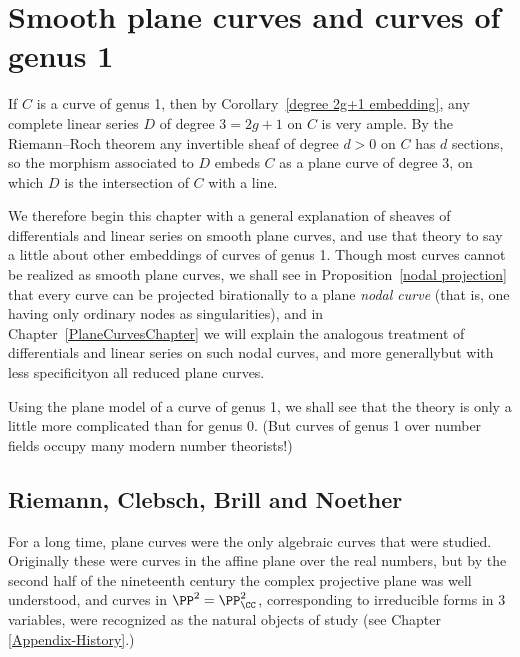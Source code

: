 
\chapter{Smooth plane curves and curves of genus 1}\label{3b}\label{genus 1 chapter}

If $C$ is a
%
curve of genus 1, then by Corollary~\ref{degree 2g+1 embedding}, any complete linear series $D$ of
degree $3 = 2g+1$ on $C$ is very ample. By the Riemann--Roch theorem any invertible sheaf
of degree $d>0$ on $C$ has $d$ sections, so the morphism associated to $D$ embeds $C$
as a plane curve of degree 3, on which $D$ is the intersection of $C$ with a line.

We therefore begin this chapter with a general explanation of
%
sheaves of differentials and linear
series on smooth plane curves, and use that theory to say a little about other embeddings of
curves of genus 1. Though most curves cannot be realized as smooth plane curves, we shall see
in Proposition~\ref{nodal projection} that every curve can be
projected birationally to a plane
\textit{nodal curve}
%
(that is, one having only ordinary nodes as singularities),
and in Chapter~\ref{PlaneCurvesChapter} we will
explain the analogous treatment of differentials and linear series on
such
nodal curves, and more
generally\emdash but with less specificity\emdash on all reduced plane curves.

Using the plane model of a curve of genus 1, we shall see that the
theory is only a little more complicated than for genus 0. (But curves
of genus 1 over number fields
occupy
many modern number theorists!)


\section{Riemann, Clebsch, Brill and Noether}
For a long time,
plane curves
%
were the only algebraic curves that were
studied. Originally these were curves in the affine plane over the
real numbers, but by the second half of the
nineteenth
century the complex
projective plane was well understood, and curves in $\PP^2 =
\PP^2_\CC$, corresponding to irreducible forms in 3 variables, were
recognized as the natural objects of study (see Chapter \ref{Appendix-History}.)


